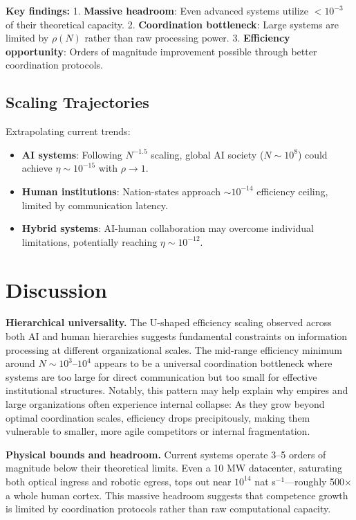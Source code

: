 \documentclass[10pt,conference]{IEEEtran}
\begin{document}
\textbf{Key findings:}
1. \textbf{Massive headroom}: Even advanced systems utilize $<10^{-3}$ of their theoretical capacity.
2. \textbf{Coordination bottleneck}: Large systems are limited by $\rho(N)$ rather than raw processing power.
3. \textbf{Efficiency opportunity}: Orders of magnitude improvement possible through better coordination protocols.

\subsection{Scaling Trajectories}
\label{sec:trajectories}

Extrapolating current trends:
\begin{itemize}
\item \textbf{AI systems}: Following $N^{-1.5}$ scaling, global AI society ($N \sim 10^8$) could achieve $\eta \sim 10^{-15}$ with $\rho \to 1$.
\item \textbf{Human institutions}: Nation-states approach $\sim 10^{-14}$ efficiency ceiling, limited by communication latency.
\item \textbf{Hybrid systems}: AI-human collaboration may overcome individual limitations, potentially reaching $\eta \sim 10^{-12}$.
\end{itemize}

\section{Discussion}

\textbf{Hierarchical universality.} The U-shaped efficiency scaling observed across both AI and human hierarchies suggests fundamental constraints on information processing at different organizational scales. 
The mid-range efficiency minimum around $N \sim 10^{3}$--$10^{4}$ appears to be a universal coordination bottleneck where systems are too large for direct communication but too small for effective institutional structures. 
Notably, this pattern may help explain why empires and large organizations often experience internal collapse: 
As they grow beyond optimal coordination scales, efficiency drops precipitously, making them vulnerable to smaller, more agile competitors or internal fragmentation.

\textbf{Physical bounds and headroom.} Current systems operate 3--5 orders of magnitude below their theoretical limits. Even a 10 MW datacenter, saturating both optical ingress and robotic egress, tops out near $10^{14}$ nat s$^{-1}$—roughly 500× a whole human cortex. This massive headroom suggests that competence growth is limited by coordination protocols rather than raw computational capacity.
\end{document}
